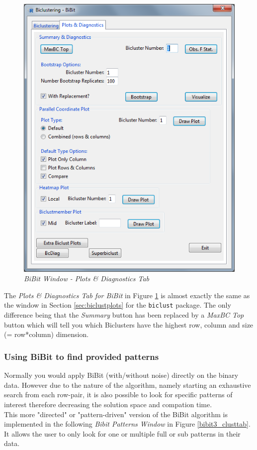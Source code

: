 \documentclass[a4paper]{article}\usepackage[]{graphicx}\usepackage[]{color}
\begin{document}
\begin{figure}[H]
\centering
\includegraphics[scale=0.5]{figures/bibit_plotdiagtab.png}
\caption{{\it BiBit Window - Plots \& Diagnostics Tab}\label{bibit_plotdiagtab}}
\end{figure}

\noindent The {\it Plots \& Diagnostics Tab for BiBit} in Figure
\ref{bibit_plotdiagtab} is almost exactly the same as the window in Section \ref{sec:biclustplots} for the \texttt{biclust} package. The only difference being that the {\it Summary} button has been replaced by a {\it MaxBC Top} button which will tell you which Biclusters have the highest row, column and size (= row*column) dimension.

\subsubsection{Using BiBit to find provided patterns}

\noindent Normally you would apply BiBit (with/without noise) directly on the
binary data.
However due to the nature of the algorithm, namely starting an exhaustive search from each row-pair, 
it is also possible to look for specific patterns of interest therefore
decreasing the solution space and compation time.\\
This more "directed" or "pattern-driven" version of the BiBit algorithm is
implemented in the following {\it Bibit Patterns Window} in Figure
\ref{bibit3_clusttab}.  It allows the user to only look for
one or multiple full or sub patterns in their data.
\end{document}

